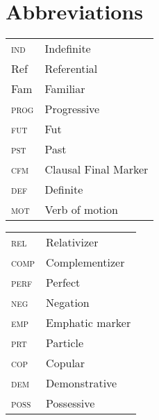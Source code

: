 \documentclass[output=paper,modfonts,nonflat,draftmode]{langsci/langscibook}
\begin{document}
\section*{Abbreviations}
\begin{tabularx}{.5\textwidth}{@{}lQ@{}} 
\textsc{ind} & Indefinite \\
       {Ref} & Referential \\
       {Fam} & Familiar \\
\textsc{prog} & Progressive \\
\textsc{fut} & Fut \\
\textsc{pst} & Past \\
\textsc{cfm} & Clausal Final Marker \\
\textsc{def} & Definite  \\
\textsc{mot} & Verb of motion  \\
\end{tabularx}%
\begin{tabularx}{.5\textwidth}{@{}lQ@{}}
\textsc{rel} & Relativizer \\
\textsc{comp} & Complementizer \\
\textsc{perf} & Perfect \\
\textsc{neg} & Negation \\
\textsc{emp} & Emphatic marker \\
\textsc{prt} & Particle \\
\textsc{cop} & Copular  \\
\textsc{dem} & Demonstrative \\
\textsc{poss} & Possessive  \\
\end{tabularx}


\end{document}
